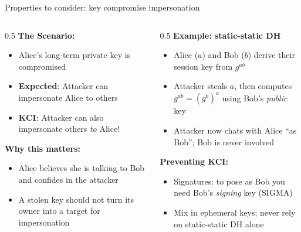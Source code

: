 \ifdefined\PRESENTATION\else\PassOptionsToClass{handout}{beamer}\fi\documentclass[aspectratio=169, lualatex]{beamer}
\begin{document}
\begin{frame}{Properties to consider: key compromise impersonation}
	\begin{columns}
		\begin{column}{0.5\textwidth}
			\textbf{The Scenario:}
			\begin{itemize}
				\item Alice's long-term private key is compromised
				\item \textbf{Expected}: Attacker can impersonate Alice to others
				\item \textbf{KCI}: Attacker can also impersonate others \textit{to} Alice!
			\end{itemize}
			\textbf{Why this matters:}
			\begin{itemize}
				\item Alice believes she is talking to Bob and confides in the attacker
				\item A stolen key should not turn its owner into a target for impersonation
			\end{itemize}
		\end{column}
		\begin{column}{0.5\textwidth}
			\textbf{Example: static-static DH}
			\begin{itemize}
				\item Alice ($a$) and Bob ($b$) derive their session key from $g^{ab}$
				\item Attacker steals $a$, then computes $g^{ab} = (g^b)^a$ using Bob's \textit{public} key
				\item Attacker now chats with Alice ``as Bob''; Bob is never involved
			\end{itemize}
			\textbf{Preventing KCI:}
			\begin{itemize}
				\item Signatures: to pose as Bob you need Bob's \textit{signing} key (SIGMA)
				\item Mix in ephemeral keys; never rely on static-static DH alone
			\end{itemize}
		\end{column}
	\end{columns}
\end{frame}
\end{document}

